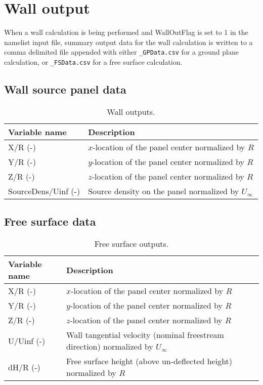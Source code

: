 \section{Wall output}
When a wall calculation is being performed and WallOutFlag is set to 1 in the namelist input file, summary output data for the wall calculation is written to a comma delimited file appended with either \texttt{\_GPData.csv} for a ground plane calculation, or \texttt{\_FSData.csv} for a free surface calculation.

\subsection{Wall source panel data}
\begin{table}[!htbp]
\centering
\caption{Wall outputs.}
\label{tbl:output_wall}
\begin{tabular}{p{}p{}}
\toprule
Variable name & Description \\ \midrule
X/R (-)             & $x$-location of the panel center normalized by $R$ \\
Y/R (-)             & $y$-location of the panel center normalized by $R$ \\
Z/R (-)             & $z$-location of the panel center normalized by $R$ \\
SourceDens/Uinf (-) & Source density on the panel normalized by $U_\infty$ \\
\bottomrule
\end{tabular}
\end{table}

\subsection{Free surface data}
\begin{table}[!htbp]
\centering
\caption{Free surface outputs.}
\label{tbl:output_free_surface}
\begin{tabular}{p{}p{}}
\toprule
Variable name & Description \\ \midrule
X/R (-)    & $x$-location of the panel center normalized by $R$ \\
Y/R (-)    & $y$-location of the panel center normalized by $R$ \\
Z/R (-)    & $z$-location of the panel center normalized by $R$ \\
U/Uinf (-) & Wall tangential velocity (nominal freestream direction) normalized by $U_\infty$ \\
dH/R (-)   & Free surface height (above un-deflected height) normalized by $R$ \\
\bottomrule
\end{tabular}
\end{table}

